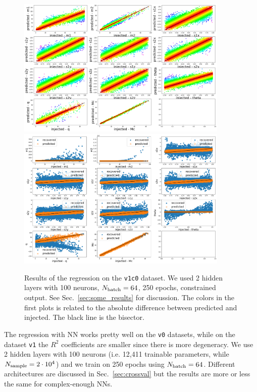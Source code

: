 \documentclass[prd,aps,twocolumn,a4paper,showkeys,nofootinbib]{article}
\begin{document}
\begin{figure}[]
  \center
  \includegraphics[width=0.9\textwidth]{./Figs/v1c0_regression.png}
  \includegraphics[width=0.9\textwidth]{./Figs/v1c0_regression_noise.png}
  \caption{\label{fig:v1c0_results} Results of the regression on the \texttt{v1c0}
  dataset. We used 2 hidden layers with 100 neurons, $N_{\rm batch}=64$, 250 epochs,  
  constrained output. See Sec.~\ref{sec:some_results} for discussion.
  The colors in the first plots is related to the absolute difference between predicted 
  and injected. The black line is the bisector.}
\end{figure}
%
The regression with NN works pretty well on the \texttt{v0} datasets, while on 
the dataset \texttt{v1} the $R^2$ coefficients are smaller since there is more degeneracy.
We use 2 hidden layers with 100 neurons (i.e. 12,411 trainable parameters, while
$N_{\rm sample}=2\cdot 10^4$) and we train on 250 epochs using 
$N_{\rm batch}=64$. Different architectures are discussed in Sec.~\ref{sec:crossval}
but the results are more or less the same for complex-enough NNs.
\end{document}
